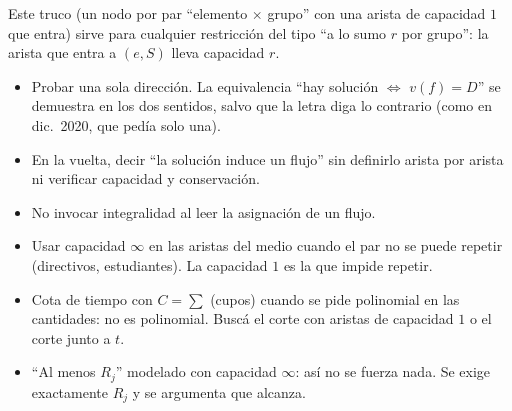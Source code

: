 \begin{center}
\end{center}

Este truco (un nodo por par ``elemento $\times$ grupo'' con una arista de capacidad $1$ que entra) sirve para cualquier restricción del tipo ``a lo sumo $r$ por grupo'': la arista que entra a $(e,S)$ lleva capacidad $r$.

\begin{trampa}
\begin{itemize}
  \item Probar una sola dirección. La equivalencia ``hay solución $\iff$ $v(f)=D$'' se demuestra en los dos sentidos, salvo que la letra diga lo contrario (como en dic.~2020, que pedía solo una).
  \item En la vuelta, decir ``la solución induce un flujo'' sin definirlo arista por arista ni verificar capacidad y conservación.
  \item No invocar integralidad al leer la asignación de un flujo.
  \item Usar capacidad $\infty$ en las aristas del medio cuando el par no se puede repetir (directivos, estudiantes). La capacidad $1$ es la que impide repetir.
  \item Cota de tiempo con $C=\sum$ (cupos) cuando se pide polinomial en las cantidades: no es polinomial. Buscá el corte con aristas de capacidad $1$ o el corte junto a $t$.
  \item ``Al menos $R_j$'' modelado con capacidad $\infty$: así no se fuerza nada. Se exige exactamente $R_j$ y se argumenta que alcanza.
\end{itemize}
\end{trampa}

